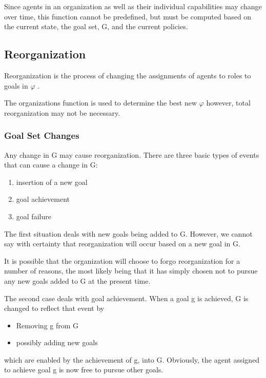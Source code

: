 Since agents in an organization as well as their individual capabilities may change over time, 
this function cannot be predefined, but must be computed based on the current state, the goal set, G, and the current policies.


\subsection{Reorganization}
Reorganization is the process of changing the assignments of agents to roles to goals in $\varphi$  \cite{omacs2}.

The organizations function is used to determine the best new $\varphi$ however, total reorganization may not be necessary.


\subsubsection{Goal Set Changes}
Any change in G may cause reorganization. There are three basic types 
of events that can cause a change in G: 
\begin{enumerate}
\item insertion of a new goal 
\item goal achievement 
\item goal failure
\end{enumerate}

The first situation deals with new goals being added to G. However, \cite{omacs2}
we cannot say with certainty that reorganization will occur based on a new goal in G. 

It is possible that the organization will choose to forgo reorganization for a number of reasons, the most likely being that it has simply chosen not to pursue any new goals added to G at the present time.

The second case deals with goal achievement. When a goal g is achieved, G is changed to reflect that event by 

\begin{itemize}
\newcommand{\localtextbulletone}{\textcolor{gray}{\raisebox{.45ex}{\rule{.6ex}{.6ex}}}}
\renewcommand{\labelitemi}{\localtextbulletone}
\item Removing g from G
\item possibly adding new goals
\end{itemize}	

 which are enabled by the achievement of g, into G. Obviously, the agent assigned to achieve goal g is now free to pursue other goals. 

